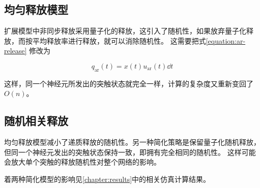 \subsection{均匀释放模型}
扩展模型中非同步释放采用量子化的释放，这引入了随机性，如果放弃量子化释放，而按平均释放率进行释放，就可以消除随机性。
这需要把式\ref{equation:ar-release}
修改为

\begin{equation}
q_\text{ar}(t) = x(t) u_\text{ar}(t)\dd{t}
\label{equation:ar-release-simplified}
\end{equation}

这样，同一个神经元所发出的突触状态就完全一样，计算的复杂度又重新变回了 $O(n)$。

\subsection{随机相关释放}
均匀释放模型减小了递质释放的随机性。另一种简化策略是保留量子化随机释放，但同一个神经元发出的突触状态保持一致，即拥有完全相同的随机性。
这样可能会放大单个突触的释放随机性对整个网络的影响。

着两种简化模型的影响见\ref{chapter:results}中的相关仿真计算结果。